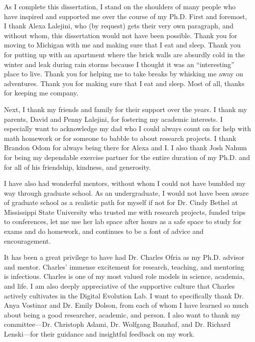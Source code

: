 
As I complete this dissertation, I stand on the shoulders of many people who have inspired and supported me over the course of my Ph.D.
First and foremost, I thank Alexa Lalejini, who (by request) gets their very own paragraph, and without whom, this dissertation would not have been possible. 
Thank you for moving to Michigan with me and making sure that I eat and sleep. 
Thank you for putting up with an apartment where the brick walls are absurdly cold in the winter and leak during rain storms because I thought it was an ``interesting'' place to live.
Thank you for helping me to take breaks by whisking me away on adventures. %
Thank you for making sure that I eat and sleep.
Most of all, thanks for keeping me company. 

Next, I thank my friends and family for their support over the years. 
I thank my parents, David and Penny Lalejini, for fostering my academic interests. %
I especially want to acknowledge my dad who I could always count on for help with math homework or for someone to babble to about research projects.
I thank Brandon Odom for always being there for Alexa and I.
I also thank Josh Nahum for being my dependable exercise partner for the entire duration of my Ph.D. and for all of his friendship, kindness, and generosity. 

I have also had wonderful mentors, without whom I could not have bumbled my way through graduate school. %
As an undergraduate, I would not have been aware of graduate school as a realistic path for myself if not for Dr. Cindy Bethel at Mississippi State University who trusted me with research projects, funded trips to conferences, let me use her lab space after hours as a safe space to study for exams and do homework, and continues to be a font of advice and encouragement.

It has been a great privilege to have had Dr. Charles Ofria as my Ph.D. advisor and mentor.
Charles' immense excitement for research, teaching, and mentoring is infectious. 
Charles is one of my most valued role models in science, academia, and life.
I am also deeply appreciative of the supportive culture that Charles actively cultivates in the Digital Evolution Lab.
I want to specifically thank Dr. Anya Vostinar and Dr. Emily Dolson,
from each of whom I have learned so much about being a good researcher, academic, and person.
I also want to thank my committee---Dr. Christoph Adami, Dr. Wolfgang Banzhaf, and Dr. Richard Lenski---for their guidance and insightful feedback on my work. 

